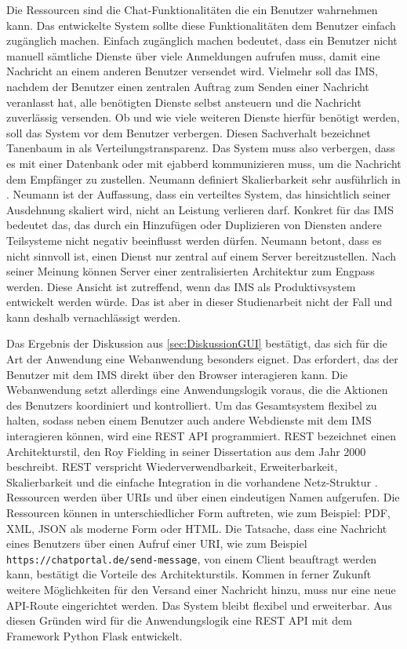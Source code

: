 \documentclass[a4paper,titlepage,halfparskip,12pt]{scrreprt}
\begin{document}
\begin{onehalfspacing}
Die Ressourcen sind die Chat-Funktionalitäten die ein Benutzer wahrnehmen kann. Das entwickelte System sollte diese Funktionalitäten dem Benutzer einfach zugänglich machen. Einfach zugänglich machen bedeutet, dass ein Benutzer nicht manuell sämtliche Dienste über viele Anmeldungen aufrufen muss, damit eine Nachricht an einem anderen Benutzer versendet wird. Vielmehr soll das \ac{IMS}, nachdem der Benutzer einen zentralen Auftrag zum Senden einer Nachricht veranlasst hat, alle benötigten Dienste selbst ansteuern und die Nachricht zuverlässig versenden. Ob und wie viele weiteren Dienste hierfür benötigt werden, soll das System vor dem Benutzer verbergen. Diesen Sachverhalt bezeichnet Tanenbaum in \cite{andrew2008verteilte} als Verteilungstransparenz. Das System muss also verbergen, dass es mit einer Datenbank oder mit ejabberd kommunizieren muss, um die Nachricht dem Empfänger zu zustellen. Neumann  definiert Skalierbarkeit sehr ausführlich in \cite{neumannDistributed1994}. Neumann ist der Auffassung, dass ein verteiltes System, das hinsichtlich seiner Ausdehnung skaliert wird, nicht an Leistung verlieren darf. Konkret für das \ac{IMS} bedeutet das, das durch ein Hinzufügen oder Duplizieren von Diensten andere Teilsysteme nicht negativ beeinflusst werden dürfen. Neumann betont, dass es nicht sinnvoll ist, einen Dienst nur zentral auf einem Server bereitzustellen. Nach seiner Meinung können Server einer zentralisierten Architektur zum Engpass werden. Diese Ansicht ist zutreffend, wenn das \ac{IMS} als Produktivsystem entwickelt werden würde. Das ist aber in dieser Studienarbeit nicht der Fall und kann deshalb vernachlässigt werden.

Das Ergebnis der Diskussion aus \autoref{sec:DiskussionGUI} bestätigt, das sich für die Art der Anwendung eine Webanwendung besonders eignet. Das erfordert, das der Benutzer mit dem \ac{IMS} direkt über den Browser interagieren kann. Die Webanwendung setzt allerdings eine Anwendungslogik voraus, die die Aktionen des Benutzers koordiniert und kontrolliert. Um das Gesamtsystem flexibel zu halten, sodass neben einem Benutzer auch andere Webdienste mit dem \ac{IMS} interagieren können, wird eine \acs{REST} \acs{API} programmiert. \acs{REST} bezeichnet einen Architekturstil, den Roy Fielding in seiner Dissertation \cite{fieldingREST} aus dem Jahr 2000 beschreibt. \ac{REST} verspricht Wiederverwendbarkeit, Erweiterbarkeit, Skalierbarkeit und die einfache Integration in die vorhandene Netz-Struktur \cite{fieldingREST}. Ressourcen werden über \acs{URI}s und über einen eindeutigen Namen aufgerufen. Die Ressourcen können in unterschiedlicher Form auftreten, wie zum Beispiel: \acs{PDF}, \acs{XML}, \acs{JSON} als moderne Form oder \acs{HTML}. Die Tatsache, dass eine Nachricht eines Benutzers über einen Aufruf einer \acs{URI}, wie zum Beispiel \texttt{https://chatportal.de/send-message}, von einem Client beauftragt werden kann, bestätigt die Vorteile des Architekturstils. Kommen in ferner Zukunft weitere Möglichkeiten für den Versand einer Nachricht hinzu, muss nur eine neue \acs{API}-Route eingerichtet werden. Das System bleibt flexibel und erweiterbar. Aus diesen Gründen wird für die Anwendungslogik eine \acs{REST} \acs{API} mit dem Framework Python Flask entwickelt.


\end{onehalfspacing}
\end{document}
